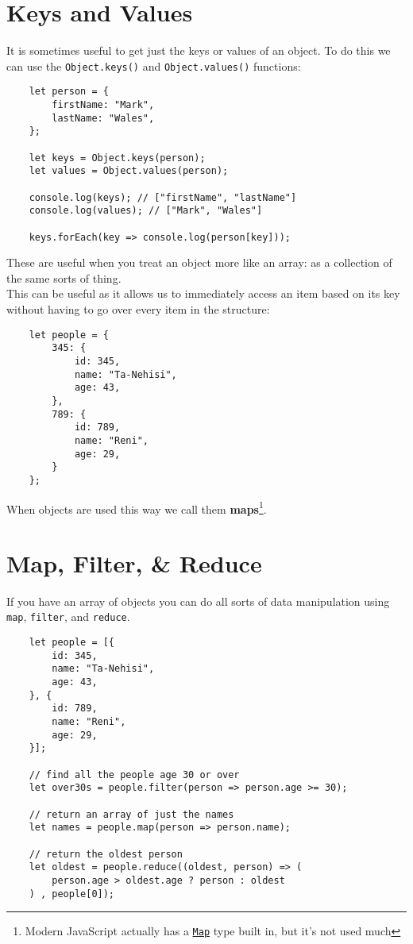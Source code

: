 \section{Keys and Values}

It is sometimes useful to get just the keys or values of an object. To do this we can use the \texttt{Object.keys()} and \texttt{Object.values()} functions:

\begin{verbatim}
    let person = {
        firstName: "Mark",
        lastName: "Wales",
    };

    let keys = Object.keys(person);
    let values = Object.values(person);

    console.log(keys); // ["firstName", "lastName"]
    console.log(values); // ["Mark", "Wales"]

    keys.forEach(key => console.log(person[key]));
\end{verbatim}

These are useful when you treat an object more like an array: as a collection of the same sorts of thing.
\\

This can be useful as it allows us to immediately access an item based on its key without having to go over every item in the structure:

\begin{verbatim}
    let people = {
        345: {
            id: 345,
            name: "Ta-Nehisi",
            age: 43,
        },
        789: {
            id: 789,
            name: "Reni",
            age: 29,
        }
    };
\end{verbatim}

When objects are used this way we call them \textbf{maps}\footnote{Modern JavaScript actually has a \href{https://developer.mozilla.org/en-US/docs/Web/JavaScript/Reference/Global_Objects/Map}{\texttt{Map}} type built in, but it's not used much}.

\pagebreak

\section{Map, Filter, \& Reduce}

If you have an array of objects you can do all sorts of data manipulation using \texttt{map}, \texttt{filter}, and \texttt{reduce}.

\begin{verbatim}
    let people = [{
        id: 345,
        name: "Ta-Nehisi",
        age: 43,
    }, {
        id: 789,
        name: "Reni",
        age: 29,
    }];

    // find all the people age 30 or over
    let over30s = people.filter(person => person.age >= 30);

    // return an array of just the names
    let names = people.map(person => person.name);

    // return the oldest person
    let oldest = people.reduce((oldest, person) => (
        person.age > oldest.age ? person : oldest
    ) , people[0]);
\end{verbatim}

